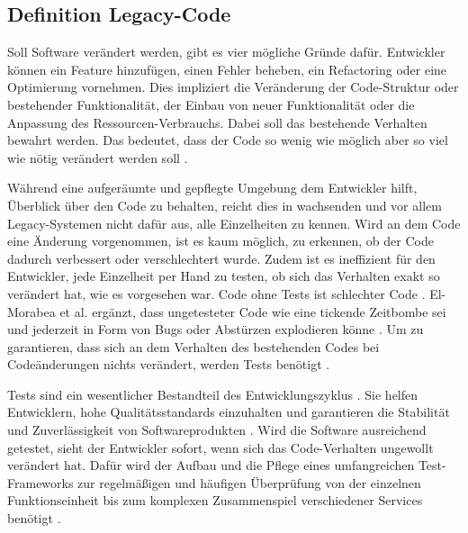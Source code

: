 \subsection{Definition Legacy-Code}
\label{ch:SdF:Legacy:sec:Legacy_ungetestet}

Soll Software verändert werden, gibt es vier mögliche Gründe dafür. Entwickler können ein Feature hinzufügen, einen Fehler beheben, ein Refactoring oder eine Optimierung vornehmen. %
Dies impliziert die Veränderung der Code-Struktur oder bestehender Funktionalität, der Einbau von neuer Funktionalität oder die Anpassung des Ressourcen-Verbrauchs. Dabei soll das bestehende Verhalten bewahrt werden. Das bedeutet, dass der Code so wenig wie möglich aber so viel wie nötig verändert werden soll \cite[S. 7]{Feathers:2013}. %

Während eine aufgeräumte und gepflegte Umgebung dem Entwickler hilft, Überblick über den Code zu behalten, reicht dies in wachsenden und vor allem Legacy-Systemen nicht dafür aus, alle Einzelheiten zu kennen. Wird an dem Code eine Änderung vorgenommen, ist es kaum möglich, zu erkennen, ob der Code dadurch verbessert oder verschlechtert wurde. Zudem ist es ineffizient für den Entwickler, jede Einzelheit per Hand zu testen, ob sich das Verhalten exakt so verändert hat, wie es vorgesehen war. \glqq Code ohne Tests ist schlechter Code\grqq{} \cite[S. XVI]{Feathers:2013}. El-Morabea et al. ergänzt, dass ungetesteter Code wie eine tickende Zeitbombe sei und jederzeit in Form von Bugs oder Abstürzen explodieren könne \cite[S. 17]{ElMorabea:2021}.
Um zu garantieren, dass sich an dem Verhalten des bestehenden Codes bei Codeänderungen nichts verändert, werden Tests benötigt \cites[S. XVI]{Feathers:2013}[S. 128]{ElMorabea:2021}[S. 25]{Oppel:2025}. %

Tests sind ein \glqq wesentlicher Bestandteil des Entwicklungszyklus\grqq{} \cite[S. 16]{Oppel:2025}. Sie helfen Entwicklern, hohe Qualitätsstandards einzuhalten und garantieren die Stabilität und Zuverlässigkeit von Softwareprodukten \cite[S. 25]{Oppel:2025}.
Wird die Software ausreichend getestet, sieht der Entwickler sofort, wenn sich das Code-Verhalten ungewollt verändert hat. Dafür wird der Aufbau und die Pflege eines umfangreichen Test-Frameworks zur regelmäßigen und häufigen Überprüfung von der einzelnen Funktionseinheit bis zum komplexen Zusammenspiel verschiedener Services benötigt \cites[S. 45]{Feathers:2013}[S. 3]{ElMorabea:2021}.

